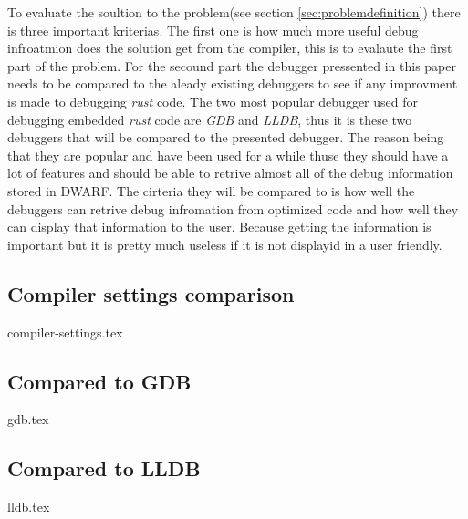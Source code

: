 

To evaluate the soultion to the problem(see section \ref{sec:problemdefinition}) there is three important kriterias.
The first one is how much more useful debug infroatmion does the solution get from the compiler, this is to evalaute the first part of the problem. 
For the secound part the debugger pressented in this paper needs to be compared to the aleady existing debuggers to see if any improvment is made to debugging \emph{rust} code.
The two most popular debugger used for debugging embedded \emph{rust} code are \emph{GDB} and \emph{LLDB}, thus it is these two debuggers that will be compared to the presented debugger.
The reason being that they are popular and have been used for a while thuse they should have a lot of features and should be able to retrive almost all of the debug information stored in \gls{DWARF}.
The cirteria they will be compared to is how well the debuggers can retrive debug infromation from optimized code and how well they can display that information to the user.
Because getting the information is important but it is pretty much useless if it is not displayid in a user friendly.


\subsection{Compiler settings comparison}
{compiler-settings.tex}


\subsection{Compared to GDB}
{gdb.tex}


\subsection{Compared to LLDB}
{lldb.tex}


